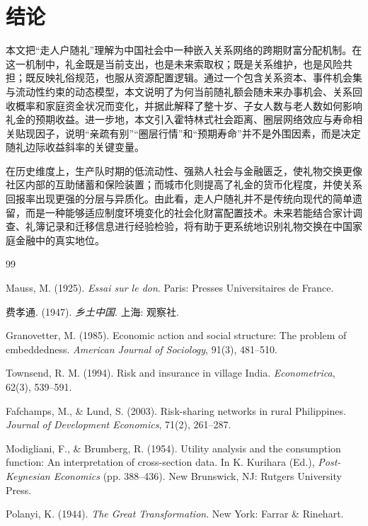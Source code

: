 \documentclass[12pt,a4paper]{ctexart}
\begin{document}
\section{结论}

本文把“走人户随礼”理解为中国社会中一种嵌入关系网络的跨期财富分配机制。在这一机制中，礼金既是当前支出，也是未来索取权；既是关系维护，也是风险共担；既反映礼俗规范，也服从资源配置逻辑。通过一个包含关系资本、事件机会集与流动性约束的动态模型，本文说明了为何当前随礼额会随未来办事机会、关系回收概率和家庭资金状况而变化，并据此解释了整十岁、子女人数与老人数如何影响礼金的预期收益。进一步地，本文引入霍特林式社会距离、圈层网络效应与寿命相关贴现因子，说明“亲疏有别”“圈层行情”和“预期寿命”并不是外围因素，而是决定随礼边际收益斜率的关键变量。

在历史维度上，生产队时期的低流动性、强熟人社会与金融匮乏，使礼物交换更像社区内部的互助储蓄和保险装置；而城市化则提高了礼金的货币化程度，并使关系回报率出现更强的分层与异质化。由此看，走人户随礼并不是传统向现代的简单遗留，而是一种能够适应制度环境变化的社会化财富配置技术。未来若能结合家计调查、礼簿记录和迁移信息进行经验检验，将有助于更系统地识别礼物交换在中国家庭金融中的真实地位。

\begin{thebibliography}{99}

Mauss, M. (1925).
\newblock \emph{Essai sur le don}.
\newblock Paris: Presses Universitaires de France.

费孝通. (1947).
\newblock \emph{乡土中国}.
\newblock 上海: 观察社.

Granovetter, M. (1985).
\newblock Economic action and social structure: The problem of embeddedness.
\newblock \emph{American Journal of Sociology}, 91(3), 481--510.

Townsend, R. M. (1994).
\newblock Risk and insurance in village India.
\newblock \emph{Econometrica}, 62(3), 539--591.

Fafchamps, M., \& Lund, S. (2003).
\newblock Risk-sharing networks in rural Philippines.
\newblock \emph{Journal of Development Economics}, 71(2), 261--287.

Modigliani, F., \& Brumberg, R. (1954).
\newblock Utility analysis and the consumption function: An interpretation of cross-section data.
\newblock In K. Kurihara (Ed.), \emph{Post-Keynesian Economics} (pp. 388--436).
\newblock New Brunswick, NJ: Rutgers University Press.

Polanyi, K. (1944).
\newblock \emph{The Great Transformation}.
\newblock New York: Farrar \& Rinehart.

\end{thebibliography}
\end{document}

